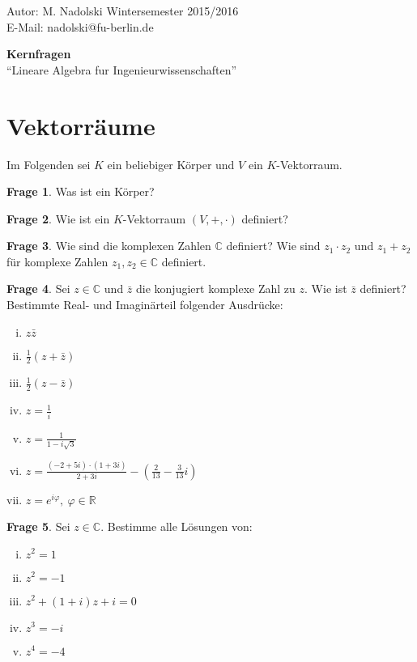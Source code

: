 \documentclass{scrartcl}
\theoremstyle{definition}
\newtheorem{frage}{Frage}[section]
\newcommand{\R}{\mathbb R}
\newcommand{\C}{\mathbb C}
\let\tmpphi\phi
\let\phi\varphi
\let\varphi\tmpphi
\begin{document}
{\raggedleft Autor: M. Nadolski \hfill Wintersemester 2015/2016}\\
E-Mail: nadolski@fu-berlin.de

\begin{center}
\LARGE\textbf {Kernfragen}\\
\large ``Lineare Algebra fur Ingenieurwissenschaften''
\end{center}

\section {Vektorräume}

Im Folgenden sei $K$ ein beliebiger Körper und $V$ ein $K$-Vektorraum.

\begin{frage}
Was ist ein Körper?
\end{frage}

\begin{frage}
Wie ist ein $K$-Vektorraum $(V, +, \cdot)$ definiert?
\end{frage}

\begin{frage}
Wie sind die komplexen Zahlen $\C$ definiert? Wie sind $z_1 \cdot z_2$
und $z_1 + z_2$ für komplexe Zahlen $z_1, z_2 \in \C$ definiert.
\end{frage}

\begin{frage}
Sei $z \in \C$ und $\bar z$ die konjugiert komplexe Zahl zu $z$. Wie ist
$\bar z$ definiert? Bestimmte Real- und Imaginärteil folgender Ausdrücke:
\begin{multicols}{2}
\begin{enumerate}[(i)]
    \item $z \bar z$
    \item $\frac 12 ( z + \bar z )$
    \item $\frac 12 ( z - \bar z )$
    \item $z = \frac 1 i$
    \item $z = \frac 1 {1 - i \sqrt 3}$
    \item $z = \frac {(-2 + 5i) \cdot (1 + 3i)}{2 + 3i} 
             - \left( \frac 2 {13} - \frac 3 {13} i \right)$
    \item $z = e^{i \phi},\: \phi \in \R$
\end{enumerate}
\end{multicols}
\end{frage}

\begin{frage}
Sei $z \in \C$. Bestimme alle Lösungen von:
\begin{multicols}{2}
\begin{enumerate}[(i)]
    \item $z^2 = 1$
    \item $z^2 = -1$
    \item $z^2 + (1 + i) z + i = 0$
    \item $z^3 = -i$
    \item $z^4 = -4$
\end{enumerate}
\end{multicols}
\end{frage}
\end{document}
